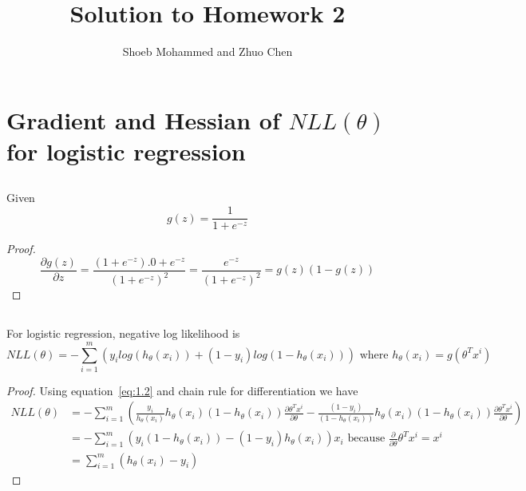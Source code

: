 \documentclass{article}
\begin{document}
\title{Solution to Homework 2}
\author{Shoeb Mohammed and Zhuo Chen}
\maketitle

\newcommand{\QEDA}{\hfill\ensuremath{\blacksquare}}
\newcommand{\QEDB}{\hfill\ensuremath{\square}}

\section{Gradient and Hessian of $NLL(\theta)$ for logistic regression}
\subsection{}
Given
\begin{equation}
  \label{eq:1.1}
  g(z) = \frac{1}{1+e^{-z}}
\end{equation}

\begin{proof}
\begin{equation}
  \label{eq:1.2}
  \frac{\partial g(z)}{\partial z} = \frac{(1+e^{-z}).0 + e^{-z}}{(1+e^{-z})^2} = \frac{e^{-z}}{(1+e^{-z})^2} = g(z)(1-g(z))
\end{equation}
\end{proof}
\subsection{}

\newcommand{\HthetaXi}{h_\theta(x_i)}

For logistic regression, negative log likelihood is
\begin{equation}
  \label{eq:1.3}
  NLL(\theta)  = - \sum_{i=1}^{m} \left( y_i log(\HthetaXi) + (1-y_i)log(1-\HthetaXi) \right) \text{ where } \HthetaXi = g(\theta^Tx^i)
\end{equation}

\begin{proof}
Using equation~\ref{eq:1.2} and chain rule for differentiation we have
\begin{equation}
  \label{eq:1.4}
  \begin{split}
  NLL(\theta)  &= - \sum_{i=1}^{m} \left( \frac{y_i}{\HthetaXi}\HthetaXi(1-\HthetaXi)\frac{\partial \theta^T x^i}{\partial \theta} 
                                         - \frac{(1-y_i)}{(1-\HthetaXi)}\HthetaXi(1-\HthetaXi)\frac{\partial \theta^T x^i}{\partial \theta} \right) \\
               &= - \sum_{i=1}^{m} \left( y_i(1-\HthetaXi) - (1-y_i)\HthetaXi\right) x_i \text{ because } \frac{\partial}{\partial \theta} \theta^T x^i = x^i \\
               &=   \sum_{i=1}^{m} \left(\HthetaXi - y_i\right)
  \end{split}
\end{equation}
\end{proof}
\end{document}
